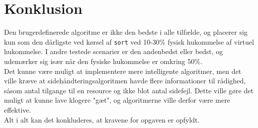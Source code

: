 \section{Konklusion}
Den brugerdefinerede algoritme er ikke den bedste i alle tilfælde, og placerer sig kun som den dårligste ved kørsel af \texttt{sort} ved 10-30\% fysisk hukommelse af virtuel hukommelse. I andre testede scenarier er den andenbedst eller bedst, og udemærker sig især når den fysiske hukommelse er omkring 50\%.\\

Det kunne være muligt at implementere mere intelligente algoritmer, men det ville kræve at sidehåndteringsalgoritmen havde flere informationer til rådighed, såsom antal tilgange til en resource og ikke blot antal sidefejl. Dette ville gøre det muligt at kunne lave klogere "gæt", og algoritmerne ville derfor være mere effektive.\\

Alt i alt kan det konkluderes, at kravene for opgaven er opfyldt.